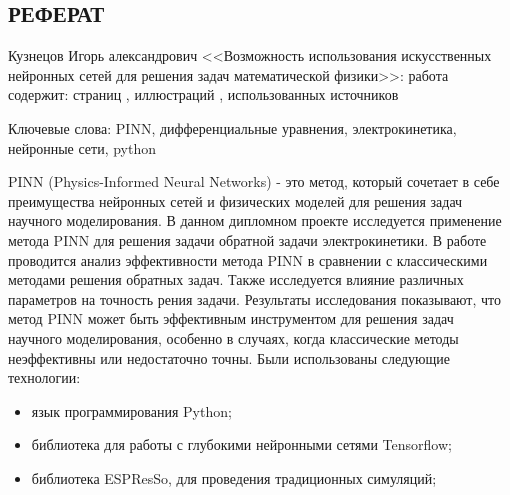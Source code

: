 

\begin{center}
    
    \section*{РЕФЕРАТ}
\end{center}

Кузнецов Игорь александрович <<Возможность использования искусственных нейронных сетей для решения задач математической физики>>:  работа содержит: страниц , иллюстраций , использованных источников 

\noindent Ключевые слова: PINN, дифференциальные уравнения, электрокинетика, нейронные сети, python

PINN (Physics-Informed Neural Networks) - это метод, который сочетает в себе преимущества нейронных сетей и физических моделей для решения задач научного моделирования. В данном дипломном проекте исследуется применение метода PINN для решения задачи обратной задачи электрокинетики. В работе проводится анализ эффективности метода PINN в сравнении с классическими методами решения обратных задач. Также исследуется влияние различных параметров на точность рения задачи. Результаты исследования показывают, что метод PINN может быть эффективным инструментом для решения задач научного моделирования, особенно в случаях, когда классические методы неэффективны или недостаточно точны.
Были использованы следующие технологии:
\begin{itemize}
    \item язык программирования Python;
    \item библиотека для работы с глубокими нейронными сетями Tensorflow;
    \item библиотека ESPResSo, для проведения традиционных симуляций;
\end{itemize}
\newpage